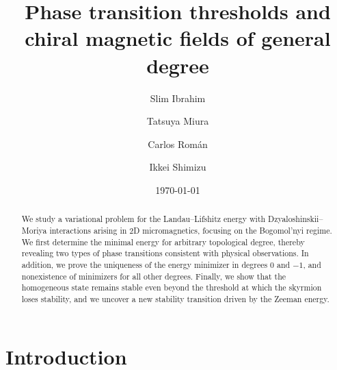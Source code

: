 \documentclass{amsart}
\title[Chiral magnetic fields of general degree]{Phase transition thresholds and chiral magnetic fields of general degree}
\author{Slim Ibrahim}
\author{Tatsuya Miura}
\author{Carlos Rom\'{a}n}
\author{Ikkei Shimizu}
\date{\today}
\numberwithin{equation}{section}
\theoremstyle{definition}
\theoremstyle{remark}
\begin{document}
\begin{abstract}
We study a variational problem for the Landau--Lifshitz energy with Dzyaloshinskii--Moriya interactions arising in 2D micromagnetics, focusing on the Bogomol'nyi regime. We first determine the minimal energy for arbitrary topological degree, thereby revealing two types of phase transitions consistent with physical observations. In addition, we prove the uniqueness of the energy minimizer in degrees $0$ and $-1$, and nonexistence of minimizers for all other degrees. Finally, we show that the homogeneous state remains stable even beyond the threshold at which the skyrmion loses stability, and we uncover a new stability transition driven by the Zeeman energy.
\end{abstract}


\maketitle

\section{Introduction}
\end{document}
